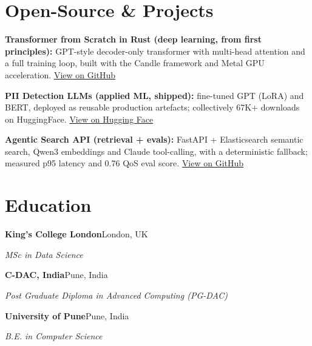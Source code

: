 \documentclass[10pt,a4paper]{article}
\begin{document}
\section{Open-Source \& Projects}
\begin{tight}
  \item \textbf{Transformer from Scratch in Rust (deep learning, from first principles):} GPT-style decoder-only transformer with multi-head attention and a full training loop, built with the Candle framework and Metal GPU acceleration. \href{https://github.com/abhijeetscode/transformer-rust}{View on GitHub}
  \item \textbf{PII Detection LLMs (applied ML, shipped):} fine-tuned GPT (LoRA) and BERT, deployed as reusable production artefacts; collectively 67K+ downloads on HuggingFace. \href{https://huggingface.co/ab-ai/pii_model}{View on Hugging Face}
  \item \textbf{Agentic Search API (retrieval + evals):} FastAPI + Elasticsearch semantic search, Qwen3 embeddings and Claude tool-calling, with a deterministic fallback; measured p95 latency and 0.76 QoS eval score. \href{https://github.com/abhijeetscode/search-agent}{View on GitHub}
\end{tight}

\section{Education}
{\color{company}\bfseries King's College London}\hfill {\color{muted}London, UK}\par
{\itshape MSc in Data Science}\par\vspace{2pt}
{\color{company}\bfseries C-DAC, India}\hfill {\color{muted}Pune, India}\par
{\itshape Post Graduate Diploma in Advanced Computing (PG-DAC)}\par\vspace{2pt}
{\color{company}\bfseries University of Pune}\hfill {\color{muted}Pune, India}\par
{\itshape B.E. in Computer Science}\par
\end{document}
